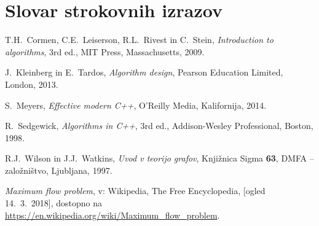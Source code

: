 \documentclass[mat1]{fmfdelo}
\begin{document}
\newpage


\section*{Slovar strokovnih izrazov}



\begin{thebibliography}{99}

T.H.~Cormen, C.E.~Leiserson, R.L.~Rivest in C.~Stein, \emph{Introduction to algorithms}, 3rd ed., MIT Press, Massachusetts, 2009.

J.~Kleinberg in E.~Tardos, \emph{Algorithm design}, Pearson Education Limited, London, 2013.

S.~Meyers, \emph{Effective modern C++}, O'Reilly Media, Kalifornija, 2014.

R.~Sedgewick, \emph{Algorithms in C++}, 3rd ed., Addison-Wesley Professional, Boston, 1998.

R.J.~Wilson in J.J.~Watkins, \emph{Uvod v teorijo grafov}, Knjižnica Sigma \textbf{63}, DMFA -- založništvo, Ljubljana, 1997.

\emph{Maximum flow problem}, v: Wikipedia, The Free Encyclopedia, [ogled 14.~3.~2018], dostopno na \url{https://en.wikipedia.org/wiki/Maximum_flow_problem}.

\end{thebibliography}
\end{document}
